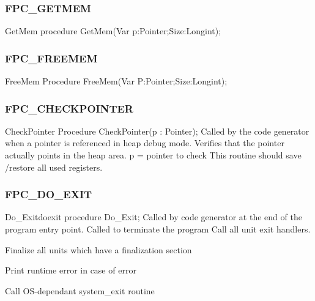 \documentclass [12pt]{article}
\begin{document}
\clearpage
\subsubsection{FPC{\_}GETMEM}
\label{subsubsec:mylabel75}

\begin{procedure}{GetMem}
\Declaration
procedure GetMem(Var p:Pointer;Size:Longint);
\end{procedure}

\subsubsection{FPC{\_}FREEMEM}
\label{subsubsec:mylabel76}

\begin{procedure}{FreeMem}
\Declaration
Procedure FreeMem(Var P:Pointer;Size:Longint);
\end{procedure}

\subsubsection{FPC{\_}CHECKPOINTER}
\label{subsubsec:mylabel77}

\begin{function}{CheckPointer}
\Declaration
Procedure CheckPointer(p : Pointer);
\Description 
Called by the code generator when a pointer is referenced in heap debug
mode. Verifies that the pointer actually points in the heap area.
\Parameters 
p = pointer to check 
\Notes 
This routine should save /restore all used registers. 
\end{function}

\subsubsection{FPC{\_}DO{\_}EXIT}
\label{subsubsec:mylabel78}

\begin{procedurel}{Do{\_}Exit}{doexit}
\Declaration
procedure Do{\_}Exit;
\Description 
Called by code generator at the end of the program entry point. 
\Notes 
Called to terminate the program 
\Algorithm
Call all unit exit handlers. \par
Finalize all units which have a finalization section \par
Print runtime error in case of error\par
Call OS-dependant system{\_}exit routine
\end{procedurel}
\end{document}
